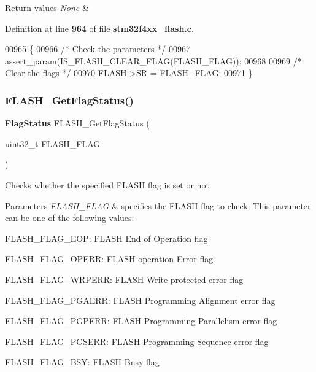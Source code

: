\begin{DoxyRetVals}{Return values}
{\em None} & \\
\hline
\end{DoxyRetVals}


Definition at line \textbf{ 964} of file \textbf{ stm32f4xx\+\_\+flash.\+c}.


\begin{DoxyCode}
00965 \{
00966   \textcolor{comment}{/* Check the parameters */}
00967   assert_param(IS_FLASH_CLEAR_FLAG(FLASH\_FLAG));
00968   
00969   \textcolor{comment}{/* Clear the flags */}
00970   FLASH->SR = FLASH\_FLAG;
00971 \}
\end{DoxyCode}
\mbox{\label{group__FLASH__Group4_gae3fb545e32f21501ca27d4380e0f2088}} 
\subsubsection{F\+L\+A\+S\+H\+\_\+\+Get\+Flag\+Status()}
{\footnotesize\ttfamily \textbf{ Flag\+Status} F\+L\+A\+S\+H\+\_\+\+Get\+Flag\+Status (\begin{DoxyParamCaption}\item[{uint32\+\_\+t}]{F\+L\+A\+S\+H\+\_\+\+F\+L\+AG }\end{DoxyParamCaption})}



Checks whether the specified F\+L\+A\+SH flag is set or not. 


\begin{DoxyParams}{Parameters}
{\em F\+L\+A\+S\+H\+\_\+\+F\+L\+AG} & specifies the F\+L\+A\+SH flag to check. This parameter can be one of the following values\+: \begin{DoxyItemize}
\item F\+L\+A\+S\+H\+\_\+\+F\+L\+A\+G\+\_\+\+E\+OP\+: F\+L\+A\+SH End of Operation flag \item F\+L\+A\+S\+H\+\_\+\+F\+L\+A\+G\+\_\+\+O\+P\+E\+RR\+: F\+L\+A\+SH operation Error flag \item F\+L\+A\+S\+H\+\_\+\+F\+L\+A\+G\+\_\+\+W\+R\+P\+E\+RR\+: F\+L\+A\+SH Write protected error flag \item F\+L\+A\+S\+H\+\_\+\+F\+L\+A\+G\+\_\+\+P\+G\+A\+E\+RR\+: F\+L\+A\+SH Programming Alignment error flag \item F\+L\+A\+S\+H\+\_\+\+F\+L\+A\+G\+\_\+\+P\+G\+P\+E\+RR\+: F\+L\+A\+SH Programming Parallelism error flag \item F\+L\+A\+S\+H\+\_\+\+F\+L\+A\+G\+\_\+\+P\+G\+S\+E\+RR\+: F\+L\+A\+SH Programming Sequence error flag \item F\+L\+A\+S\+H\+\_\+\+F\+L\+A\+G\+\_\+\+B\+SY\+: F\+L\+A\+SH Busy flag \end{DoxyItemize}
\\
\hline
\end{DoxyParams}

